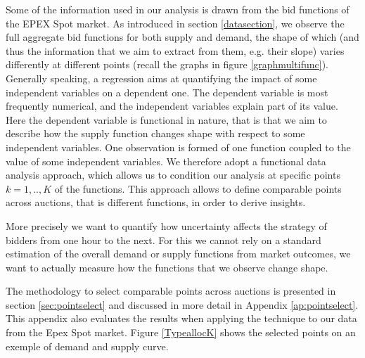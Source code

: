 Some of the information used in our analysis is drawn from the bid functions of the EPEX Spot market. As introduced in section \ref{datasection}, we observe the full aggregate %
bid functions for both supply and demand, %
the shape of which %
(and thus the information that we aim to extract from them, e.g. their slope) varies differently at different points (recall the graphs in figure \ref{graphmultifunc}). %
Generally speaking, a regression aims at quantifying the impact of some independent variables on a dependent one. The dependent variable is most frequently numerical, and the independent variables explain part of its value. Here the dependent variable is functional in nature, that is that we aim to describe how the supply function changes shape with respect to some independent variables. One observation is formed of one function coupled to the value of some independent variables. We therefore adopt a functional data analysis approach, which allows us to condition our analysis at specific points $k=1,..,K$ of the functions.
This approach allows to define comparable points across auctions, that is different functions, in order to derive insights.   

More precisely we want to quantify how uncertainty affects the strategy of bidders from one hour to the next. For this we cannot rely on a standard estimation of the overall demand or supply functions from market outcomes, we want to actually measure how the functions that we observe change shape. 

The methodology to select comparable points across auctions is presented in section \ref{sec:pointselect} and discussed in more detail in Appendix \ref{ap:pointselect}. 
This appendix also evaluates the results when applying the technique to our data from the Epex Spot market. Figure \ref{TypeallocK} shows the selected points on an exemple of demand and supply curve. 

